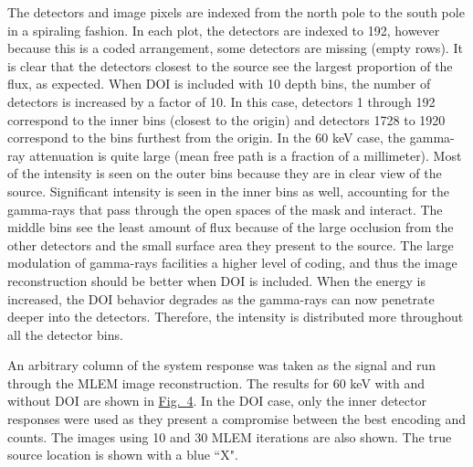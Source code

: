 \documentclass[10pt]{article}
\begin{document}
The detectors and image pixels are indexed from the north pole to the south pole in a spiraling fashion. In each plot, the detectors are indexed to 192, however because this is a coded arrangement, some detectors are missing (empty rows). It is clear that the detectors closest to the source see the largest proportion of the flux, as expected. When DOI is included with 10 depth bins, the number of detectors is increased by a factor of 10. In this case, detectors 1 through 192 correspond to the inner bins (closest to the origin) and detectors 1728 to 1920 correspond to the bins furthest from the origin. In the 60 keV case, the gamma-ray attenuation is quite large (mean free path is a fraction of a millimeter). Most of the intensity is seen on the outer bins because they are in clear view of the source. Significant intensity is seen in the inner bins as well, accounting for the gamma-rays that pass through the open spaces of the mask and interact. The middle bins see the least amount of flux because of the large occlusion from the other detectors and the small surface area they present to the source. The large modulation of gamma-rays facilities a higher level of coding, and thus the image reconstruction should be better when DOI is included. When the energy is increased, the DOI behavior degrades as the gamma-rays can now penetrate deeper into the detectors. Therefore, the intensity is distributed more throughout all the detector bins.

An arbitrary column of the system response was taken as the signal and run through the MLEM image reconstruction. The results for 60 keV with and without DOI are shown in \hyperlink{fig4}{Fig.~4}. In the DOI case, only the inner detector responses were used as they present a compromise between the best encoding and counts. The images using 10 and 30 MLEM iterations are also shown. The true source location is shown with a blue ``X".
\end{document}
